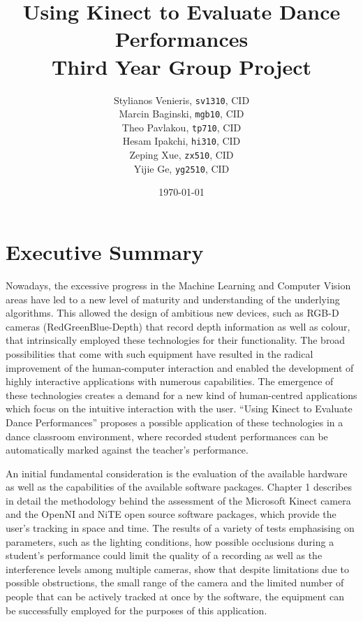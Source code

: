 \documentclass[10pt,a4paper]{article}
\begin{document}
\title{Using Kinect to Evaluate Dance Performances\\ Third Year Group Project}
\author{Stylianos Venieris, \texttt{sv1310}, CID \\
Marcin Baginski, \texttt{mgb10}, CID \\
Theo Pavlakou, \texttt{tp710}, CID \\
Hesam Ipakchi, \texttt{hi310}, CID \\
Zeping Xue, \texttt{zx510}, CID \\
Yijie Ge, \texttt{yg2510}, CID }
\date{\today}
\maketitle
{}
\newpage


\section*{\center Executive Summary}
Nowadays, the excessive progress in the Machine Learning and Computer Vision areas have led to a new level of maturity and understanding of the underlying algorithms. This allowed the design of ambitious new devices, such as RGB-D cameras (RedGreenBlue-Depth) that record depth information as well as colour, that intrinsically employed these technologies for their functionality. The broad possibilities that come with such equipment have resulted in the radical improvement of the human-computer interaction and enabled the development of highly interactive applications with numerous capabilities. The emergence of these technologies creates a demand for a new kind of human-centred applications which focus on the intuitive interaction with the user. “Using Kinect to Evaluate Dance Performances” proposes a possible application of these technologies in a dance classroom environment, where recorded student performances can be automatically marked against the teacher’s performance.

\noindent
An initial fundamental consideration is the evaluation of the available hardware as well as the capabilities of the available software packages. Chapter 1 describes in detail the methodology behind the assessment of the Microsoft Kinect camera and the OpenNI and NiTE open source software packages, which provide the user’s tracking in space and time. The results of a variety of tests emphasising on parameters, such as the lighting conditions, how possible occlusions during a student’s performance could limit the quality of a recording as well as the interference levels among multiple cameras, show that despite limitations due to possible obstructions, the small range of the camera and the limited number of people that can be actively tracked at once by the software, the equipment can be successfully employed for the purposes of this application.
\end{document}
